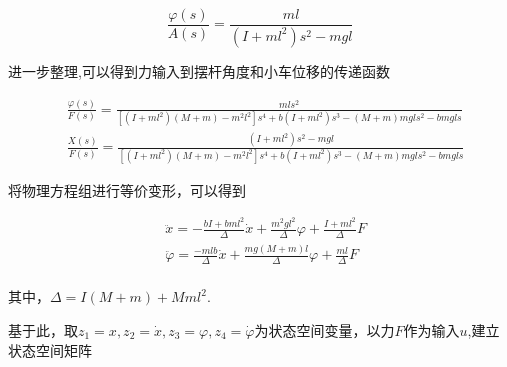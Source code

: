 \begin{equation}
\frac{\varphi(s)}{A(s)}=\frac{ml}{(I+ml^2)s^2-mgl}
\end{equation}

进一步整理,可以得到力输入到摆杆角度和小车位移的传递函数

\begin{equation}
\begin{aligned}
&\frac{\varphi(s)}{F(s)}=\frac{mls^2}{[(I+ml^2)(M+m)-m^2l^2]s^4+b(I+ml^2)s^3-(M+m)mgls^2-bmgls}\\
&\frac{X(s)}{F(s)}=\frac{(I+ml^2)s^2-mgl}{[(I+ml^2)(M+m)-m^2l^2]s^4+b(I+ml^2)s^3-(M+m)mgls^2-bmgls}
\end{aligned}
\end{equation}

将物理方程组进行等价变形，可以得到

\begin{equation}
\begin{aligned}
&\ddot x=-\frac{bI+bml^2}{\Delta}\dot x+\frac{m^2gl^2}{\Delta}\varphi+\frac{I+ml^2}{\Delta}F\\
&\ddot{\varphi}=\frac{-mlb}{\Delta}\dot x+\frac{mg(M+m)l}{\Delta}\varphi+\frac{ml}{\Delta}F\\
\end{aligned}
\end{equation}

其中，$\Delta=I(M+m)+Mml^2$.

基于此，取$z_1=x,z_2=\dot x,z_3=\varphi,z_4=\dot{\varphi}$为状态空间变量，以力$F$作为输入$u$,建立状态空间矩阵

